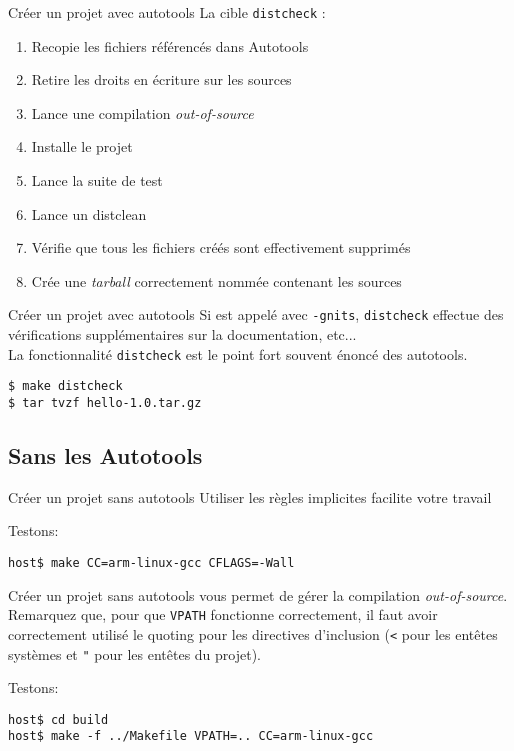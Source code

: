 \begin{frame}[fragile=singleslide]{Créer un projet avec autotools}
  La cible \verb+distcheck+ :
  \begin{enumerate}
  \item Recopie les fichiers référencés dans Autotools
  \item Retire les droits en écriture sur les sources
  \item Lance une compilation \emph{out-of-source}
  \item Installe le projet
  \item Lance la suite de test
  \item Lance un distclean
  \item Vérifie que tous les fichiers créés sont effectivement supprimés
  \item Crée une \emph{tarball} correctement nommée contenant les sources
  \end{enumerate}
\end{frame}

\begin{frame}[fragile=singleslide]{Créer un projet avec autotools}
  Si   est appelé avec  \verb+-gnits+, \verb+distcheck+
  effectue des vérifications supplémentaires sur la documentation,
  etc...
  \\[2ex]
  La fonctionnalité \verb+distcheck+ est  le point fort souvent énoncé
  des autotools.
\begin{lstlisting}
$ make distcheck
$ tar tvzf hello-1.0.tar.gz
\end{lstlisting} %
\end{frame}

\subsection{Sans les Autotools}

\begin{frame}[fragile=singleslide]{Créer un projet sans autotools}
  Utiliser les règles implicites facilite votre travail
  
  Testons:
\begin{lstlisting}
host$ make CC=arm-linux-gcc CFLAGS=-Wall
\end{lstlisting} %
\end{frame}

\begin{frame}[fragile=singleslide]{Créer un projet sans autotools}
   vous permet de gérer la compilation \emph{out-of-source}.
  Remarquez que, pour que \verb+VPATH+ fonctionne correctement, il faut avoir
  correctement utilisé le quoting pour les directives d'inclusion (\verb+<+ pour
  les entêtes systèmes et \verb+"+ pour les entêtes du projet).
  
  Testons: 
\begin{lstlisting}
host$ cd build
host$ make -f ../Makefile VPATH=.. CC=arm-linux-gcc
\end{lstlisting} %
\end{frame}

